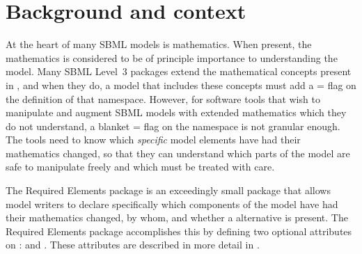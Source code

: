 
\section{Background and context}
\label{background}

At the heart of many SBML models is mathematics. When present, the mathematics is considered to be of principle importance to understanding the model. Many SBML Level~3 packages extend the mathematical concepts present in \sbmlthreecore, and when they do, a model that includes these concepts must add a = flag on the definition of that namespace.  However, for software tools that wish to manipulate and augment SBML models with extended mathematics which they do not understand, a blanket = flag on the namespace is not granular enough.  The tools need to know which \emph{specific} model elements have had their mathematics changed, so that they can understand which parts of the model are safe to manipulate freely and which must be treated with care.

The Required Elements package is an exceedingly small package that allows model writers to declare specifically which components of the model have had their mathematics changed, by whom, and whether a \sbmlthreecore alternative is present.  The Required Elements package accomplishes this by defining two optional attributes on \SBase:  and .  These attributes are described in more detail in .

